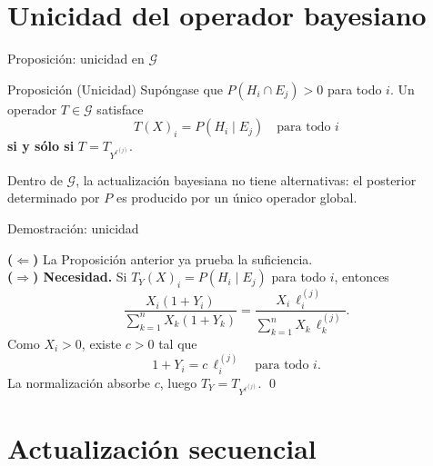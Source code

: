 \documentclass[12pt, aspectratio=169]{beamer}
\begin{document}
\section{Unicidad del operador bayesiano}

\begin{frame}{Proposición: unicidad en $\mathcal{G}$}

  \begin{alertblock}{Proposición (Unicidad)}
    Supóngase que $P(H_i \cap E_j) > 0$ para todo $i$.
    Un operador $T \in \mathcal{G}$ satisface
    \[
      T(X)_i = P(H_i \mid E_j) \quad \text{para todo } i
    \]
    \textbf{si y sólo si} $T = T_{Y^{\ell^{(j)}}}$.
  \end{alertblock}

  \vspace{4pt}
  \small Dentro de $\mathcal{G}$, la actualización bayesiana no tiene alternativas:
  el posterior determinado por $P$ es producido por un único operador global.
\end{frame}

\begin{frame}{Demostración: unicidad}

  \textbf{($\Leftarrow$)} La Proposición anterior ya prueba la suficiencia. \\[8pt]

  \textbf{($\Rightarrow$) Necesidad.}
  Si $T_Y(X)_i = P(H_i \mid E_j)$ para todo $i$, entonces
  \[
    \frac{X_i(1+Y_i)}{\sum_{k=1}^n X_k(1+Y_k)}
    = \frac{X_i\,\ell_i^{(j)}}{\sum_{k=1}^n X_k\,\ell_k^{(j)}}.
  \]
  Como $X_i > 0$, existe $c>0$ tal que
  \[
    1+Y_i = c\,\ell_i^{(j)} \quad \text{para todo } i.
  \]
  La normalización absorbe $c$, luego $T_Y = T_{Y^{\ell^{(j)}}}$. \qed
\end{frame}

\section{Actualización secuencial}
\end{document}
